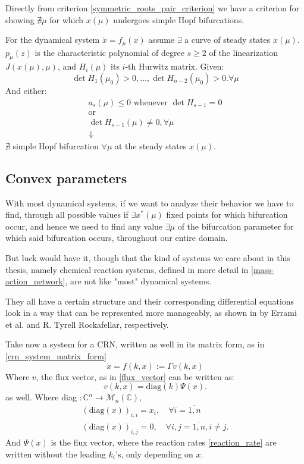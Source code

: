 Directly from criterion \ref{symmetric_roots_pair_criterion} we have a criterion for showing $\nexists \mu$ for which $x(\mu)$ undergoes simple Hopf bifurcations.
\begin{theorem}\label{ruling_out_simple_hopf_bif}

	For the dynamical system $\dot{x} = f_\mu(x)$ assume $\exists$ a curve of steady states $x(\mu)$.
	$p_\mu(z)$ is the characteristic polynomial of degree $s \geq 2$ of the linearization $J(x(\mu), \mu)$, and $H_i(\mu)$ its $i$-th Hurwitz matrix. Given:
	\[
		\det H_1(\mu_0) > 0 , \dots, \det H_{n-2} (\mu_0) > 0. \forall \mu
	\]
	And either:
	\begin{gather*}
		a_s(\mu) \leq 0 \text{ whenever  } \det H_{s-1} = 0  \\
		\text{or} \\
		\det   H_{s-1}(\mu) \neq 0, \forall \mu    \\
		\Downarrow
	\end{gather*}
	$\nexists$ simple Hopf bifurcation $\forall \mu$ at the steady states $x(\mu)$.
\end{theorem}

\subsection{Convex parameters}\label{convex_paramteres}

With most dynamical systems, if we want to analyze their behavior we have to find, through all possible values if $\exists x^*(\mu)$ fixed points for which bifurcation occur, and hence we need to find any value $\exists \mu$ of the bifurcation parameter for which said bifurcation occurs, throughout our entire domain.

But luck would have it, though that the kind of systems we care about in this thesis, namely chemical reaction systems, defined in more detail in \ref{mass-action_network}, are not like "most" dynamical systems.

They all have a certain structure and their corresponding differential equations look in a way that can be represented more manageably, as shown in \cite{ErramiEtAl2015a, Rockafellar1973} by Errami et al. and R. Tyrell Rockafellar, respectively.

Take now a system for a CRN, written as well in its matrix form, as in \ref{crn_system_matrix_form}
\[
	\dot{x} = f(k,x) :=\Gamma v(k,x)
\]
Where $v$, the flux vector, as in \ref{flux_vector} can be written as:
\[
	v(k, x) = \text{diag}(k)\Psi(x).
\]
as well.
Where diag $: \mathbb{C}^n \rightarrow \mathcal{M}_n(\mathbb{C})$,
\begin{align*}
	(\text{diag}(x))_{i,i} = x_i, \quad \forall i = \overline{1,n} \\
	(\text{diag}(x))_{i,j} = 0, \quad \forall i,j = \overline{1,n} , i \neq j.
\end{align*}
And $\Psi(x)$ is the flux vector, where the reaction rates \ref{reaction_rate} are written without the leading $k_i$'s, only depending on $x$.

